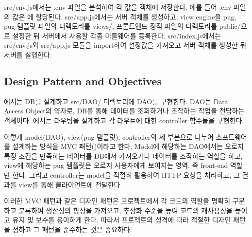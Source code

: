 src/env.js에서는 .env 파일을 분석하여 각 값을  객체에 저장한다. 예를 들어 .env 파일의  값은 에 할당된다. src/app.js에서는 서버 객체를 생성하고, view engine을 pug, pug 템플릿 파일의 디렉토리를 views/, 프론트엔드 정적 파일의 디렉토리를 public/으로 설정한 뒤 서버에서 사용할 각종 미들웨어를 등록한다. src/index.js에서는 src/env.js와 src/app.js 모듈을 import하여 설정값을 가져오고 서버 객체를 생성한 뒤 서버를 실행한다.

\subsection*{Design Pattern and Objectives}

에서는 DB를 설계하고 src/DAO/ 디렉토리에 DAO를 구현한다. DAO는 Data Access Object의 약자로, DB를 통해 데이터를 조회하거나 조작하는 작업을 전담하는 객체이다. 에서는 라우팅을 설계하고 각 라우트에 대한 controller 함수들을 구현한다.

이렇게 model(DAO), view(pug 템플릿), controller의 세 부분으로 나누어 소프트웨어를 설계하는 방식을 MVC 패턴()이라고 한다. Model에 해당하는 DAO에서는 오로지 특정 조건을 만족하는 데이터를 DB에서 가져오거나 데이터를 조작하는 역할을 하고, view에 해당하는 pug 템플릿은 오로지 사용자에게 보여지는 영역, 즉 front-end 역할만 한다. 그리고 controller는 model을 적절히 활용하여 HTTP 요청을 처리하고, 그 결과를 view를 통해 클라이언트에 전달한다.


이러한 MVC 패턴과 같은 디자인 패턴은 프로젝트에서 각 코드의 역할을 명확히 구분하고 분류하여 생산성의 향상을 가져오고, 추상화 수준을 높여 코드의 재사용성을 높이고 유지 및 보수를 용이하게 한다. 따라서 프로젝트의 성격에 따라 적절한 디자인 패턴을 정하고 그 패턴을 준수하는 것은 중요하다.
